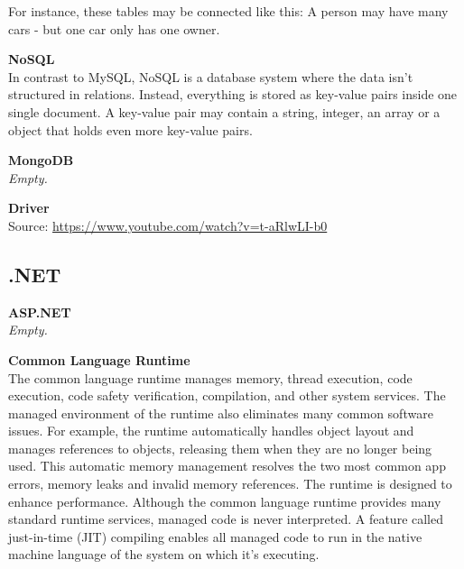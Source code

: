 For instance, these tables may be connected like this: A person may have many cars - but one car only has one owner. 

\textbf{NoSQL } \cite{software:NoSQL} \\
In contrast to MySQL, NoSQL is a database system where the data isn't structured in relations. Instead, everything is stored as key-value pairs inside one single document. A key-value pair may contain a string, integer, an array or a object that holds even more key-value pairs. 

\textbf{MongoDB} \cite{software:MongoDB} \\
\textit{Empty.}


\textbf{Driver} \\
Source: \url{https://www.youtube.com/watch?v=t-aRlwLI-b0}

\clearpage
\subsection{.NET}

\textbf{ASP.NET} \\
\textit{Empty.}


\textbf{Common Language Runtime \cite{software:CLR}} \\
The common language runtime manages memory, thread execution, code execution, code safety verification, compilation, and other system services. 
The managed environment of the runtime also eliminates many common software issues. For example, the runtime automatically handles object layout and manages references to objects, releasing them when they are no longer being used. This automatic memory management resolves the two most common app errors, memory leaks and invalid memory references.
The runtime is designed to enhance performance. Although the common language runtime provides many standard runtime services, managed code is never interpreted. A feature called just-in-time (JIT) compiling enables all managed code to run in the native machine language of the system on which it's executing.

